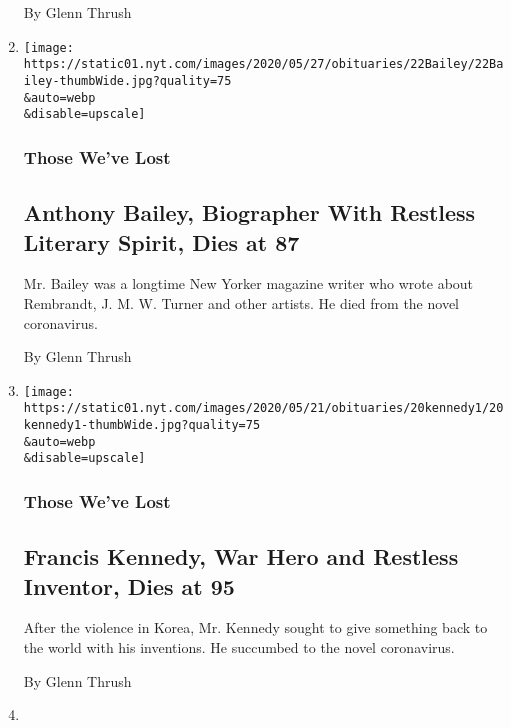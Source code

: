\begin{enumerate}
  By Glenn Thrush
\item
  \href{/2020/05/26/books/anthony-bailey-dead-coronavirus.html}{}

  \texttt{[image: https://static01.nyt.com/images/2020/05/27/obituaries/22Bailey/22Bailey-thumbWide.jpg?quality=75\\\&auto=webp\\\&disable=upscale]}

  \hypertarget{those-weve-lost-1}{%
  \subsubsection{Those We've Lost}\label{those-weve-lost-1}}

  \hypertarget{anthony-bailey-biographer-with-restless-literary-spirit-dies-at-87}{%
  \subsection{Anthony Bailey, Biographer With Restless Literary Spirit,
  Dies at
  87}\label{anthony-bailey-biographer-with-restless-literary-spirit-dies-at-87}}

  Mr. Bailey was a longtime New Yorker magazine writer who wrote about
  Rembrandt, J. M. W. Turner and other artists. He died from the novel
  coronavirus.

  By Glenn Thrush
\item
  \href{/2020/05/20/us/francis-a-kennedy-dead-coronavirus.html}{}

  \texttt{[image: https://static01.nyt.com/images/2020/05/21/obituaries/20kennedy1/20kennedy1-thumbWide.jpg?quality=75\\\&auto=webp\\\&disable=upscale]}

  \hypertarget{those-weve-lost-2}{%
  \subsubsection{Those We've Lost}\label{those-weve-lost-2}}

  \hypertarget{francis-kennedy-war-hero-and-restless-inventor-dies-at-95}{%
  \subsection{Francis Kennedy, War Hero and Restless Inventor, Dies at
  95}\label{francis-kennedy-war-hero-and-restless-inventor-dies-at-95}}

  After the violence in Korea, Mr. Kennedy sought to give something back
  to the world with his inventions. He succumbed to the novel
  coronavirus.

  By Glenn Thrush
\item
  \href{/2020/05/09/us/politics/obama-flynn-coronavirus-trump.html}{}


\end{enumerate}
